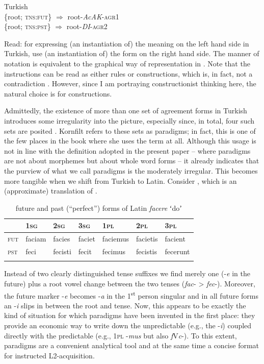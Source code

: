 \documentclass[output=paper]{langsci/langscibook}
\begin{document}
\ea \label{ex:reiner:2}
 {Turkish}\\
    \ea 
    \{root; \textsc{tns}:\textsc{fut}\} ${\Rightarrow}$ root-\textit{AcAK}{}-\textsc{agr}1 \\
    \ex \{root; \textsc{tns}:\textsc{pst}\} ${\Rightarrow}$ root-\textit{DI}{}-\textsc{agr}2
\z \z

Read: for expressing (an instantiation of) the meaning on the left hand side in Turkish, use (an instantiation of) the form on the right hand side. The manner of notation is equivalent to the graphical way of representation in . Note that the instructions can be read as either rules or constructions, which is, in fact, not a contradiction \citep[123--124]{Rostila2011}. However, since I am portraying constructionist thinking here, the natural choice is for constructions.

Admittedly, the existence of more than one set of agreement forms in Turkish introduces some irregularity into the picture, especially since, in total, four such sets are posited \citep[382]{Kornfilt1997}. Kornfilt refers to these sets as paradigms; in fact, this is one of the few places in the book where she uses the term at all. Although this usage is not in line with the definition adopted in the present paper – where paradigms are not about morphemes but about whole word forms – it already indicates that the purview of what we call paradigms is the moderately irregular. This becomes more tangible when we shift from Turkish to Latin. Consider , which is an (approximate) translation of .

\begin{table}
\caption{future and past (“perfect”) forms of Latin \textit{facere} ʻdoʼ \citep[ch. 7]{Panhuis2009}\label{tab:reiner:3}}
\begin{tabular}{lllllll}
\lsptoprule
& {\textsc{1sg}} & {\textsc{2sg}} & {\textsc{3sg}} & {\textsc{1pl}} & {\textsc{2pl}} & {\textsc{3pl}}\\
\midrule
{\textsc{fut}} & faciam & facies & faciet & faciemus & facietis & facient\\
{\textsc{pst}} & feci & fecisti & fecit & fecimus & fecistis & fecerunt\\
\lspbottomrule
\end{tabular}
\end{table}

Instead of two clearly distinguished tense suffixes we find merely one (-\textit{e} in the future) plus a root vowel change between the two tenses (\textit{fac}{}- > \textit{fec}{}-). Moreover, the future marker -\textit{e} becomes -\textit{a} in the 1\textsuperscript{st} person singular and in all future forms an -\textit{i} slips in between the root and tense. Now, this appears to be exactly the kind of situation for which paradigms have been invented in the first place: they provide an economic way to write down the unpredictable (e.g., the -\textit{i}) coupled directly with the predictable (e.g., 1\textsc{pl} -\textit{mus} but also \textit{f}V\textit{c}{}-). To this extent, paradigms are a convenient analytical tool and at the same time a concise format for instructed L2-acquisition.
\end{document}
